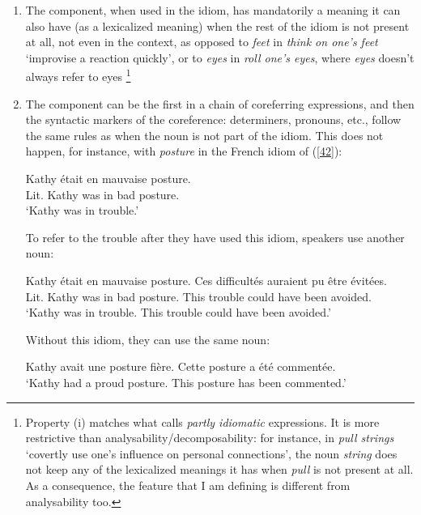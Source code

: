 \documentclass[output=paper]{langsci/langscibook}
\begin{document}
\renewcommand{\theenumi}{(\roman{enumi})}%
\begin{enumerate}
\item The component, when used in the idiom, has mandatorily a meaning it can also have (as a lexicalized meaning) when the rest of the idiom is not present at all, not even in the context, as opposed to \textit{feet} in \textit{think on one’s feet} ‘improvise a reaction quickly’, or to \textit{eyes} in \textit{roll one’s eyes}, where\textit{ eyes} doesn’t always refer to eyes \footnote{ Property (i) matches what \citet[96]{Burger2007} calls \textit{partly idiomatic} expressions. It is more restrictive than analysability\slash decomposability: for instance, in \textit{pull strings} ‘covertly use one’s influence on personal connections’, the noun \textit{string} does not keep any of the lexicalized meanings it has when \textit{pull} is not present at all. As a consequence, the feature that I am defining is different from analysability too.}

\item The component can be the first in a chain of coreferring expressions, and then the syntactic markers of the coreference: determiners, pronouns, etc., follow the same rules as when the noun is not part of the idiom. This does not happen, for instance, with \textit{posture} in the French idiom of (\ref{42}):

\begin{exe}
\ex \label{42}
 Kathy était en mauvaise posture.\\
Lit. Kathy was in bad posture.\\
‘Kathy was in trouble.’
\end{exe}

To refer to the trouble after they have used this idiom, speakers use another noun:

\begin{exe}
\ex \label{43}
Kathy était en mauvaise posture. Ces difficultés auraient pu être évitées.\\
Lit. Kathy was in bad posture. This trouble  could have  been avoided.\\
‘Kathy was in trouble. This trouble could have been avoided.’
\end{exe}
  
Without this idiom, they can use the same noun:

\begin{exe}
\ex \label{44}
Kathy avait une posture fière. Cette posture a été commentée.\\
‘Kathy had a proud posture. This posture has been commented.’
\end{exe}


\end{enumerate}
\end{document}
